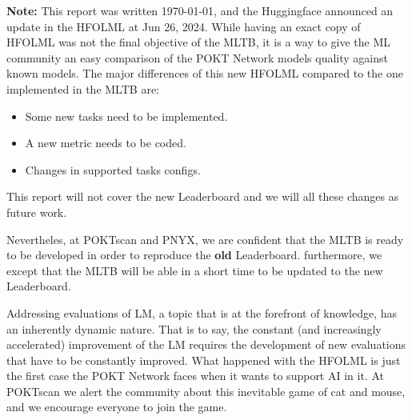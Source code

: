 \begin{tcolorbox}[colback=red!5!white,colframe=red!75!black]
\textbf{Note:} This report was written \today, and the Huggingface announced an update in the \gls{HFOLML} at Jun 26, 2024. 
While having an exact copy of \gls{HFOLML} was not the final objective of the \gls{MLTB}, it is a way to give the \gls{ML} community an easy comparison of the POKT Network models quality against known models.
The major differences of this new \gls{HFOLML} compared to the one implemented in the \gls{MLTB} are:
\begin{itemize}
    \item Some new tasks need to be implemented.
    \item A new metric needs to be coded.
    \item Changes in supported tasks configs.
\end{itemize}
This report will not cover the new Leaderboard and we will all these changes as future work.

Nevertheles, at POKTscan and PNYX, we are confident that the \gls{MLTB} is ready to be developed in order to reproduce the \textbf{old} Leaderboard. 
furthermore, we except that the \gls{MLTB} will be able in a short time to be updated to the new Leaderboard. 

Addressing evaluations of \gls{LM}, a topic that is at the forefront of knowledge, has an inherently dynamic nature. 
That is to say, the constant (and increasingly accelerated) improvement of the \gls{LM} requires the development of new evaluations that have to be constantly improved. 
What happened with the \gls{HFOLML} is just the first case the POKT Network faces when it wants to support AI in it. 
At POKTscan we alert the community about this inevitable game of cat and mouse, and we encourage everyone to join the game. 
\end{tcolorbox}